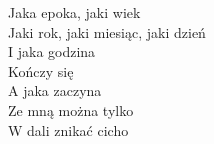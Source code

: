 \begin{flushleft}
\vskip 3mm
\hspace{1.8cm}Jaka epoka, jaki wiek \\
\hspace{1.8cm}Jaki rok, jaki miesiąc, jaki dzień \\
\hspace{1.8cm}I jaka godzina \\
\hspace{1.8cm}Kończy się \\
\hspace{1.8cm}A jaka zaczyna \\
\vskip 3mm
\hspace{0.9cm}Ze mną można tylko \\
\hspace{0.9cm}W dali znikać cicho  \\
\end{flushleft}
\clearpage
